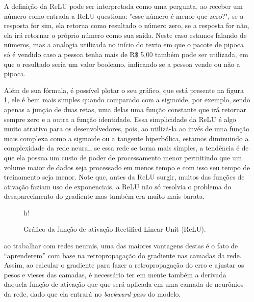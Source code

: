 A definição da ReLU pode ser interpretada como uma pergunta, ao receber um número como entrada a ReLU questiona: "esse número é menor que zero?", se a resposta for sim, ela retorna como resultado o número zero, se a resposta for não, ela irá retornar o próprio número como sua saída. Neste caso estamos falando de números, mas a analogia utilizada no início do texto em que o pacote de pipoca só é vendido caso a pessoa tenha mais de R\$ 5,00 também pode ser utilizada, em que o resultado seria um valor booleano, indicando se a pessoa vende ou não a pipoca.

Além de sua fórmula, é possível plotar o seu gráfico, que está presente na figura \ref{fig:relu}, ele é bem mais simples quando comparado com a sigmoide, por exemplo, sendo apenas a junção de duas retas, uma delas uma função constante que irá retornar sempre zero e a outra a função identidade. Essa simplicidade da ReLU é algo muito atrativo para os desenvolvedores, pois, ao utilizá-la ao invés de uma função mais complexa como a sigmoide ou a tangente hiperbólica, estamos diminuindo a complexidade da rede neural, se essa rede se torna mais simples, a tendência é de que ela possua um custo de poder de processamento menor permitindo que um volume maior de dados seja processado em menos tempo e com isso seu tempo de treinamento seja menor. Note que, antes da ReLU surgir, muitos das funções de ativação faziam uso de exponenciais, a ReLU não só resolvia o problema do desaparecimento do gradiente mas também era muito mais barata.

\begin{figure}{h!}
    \centering
    \caption{Gráfico da função de ativação Rectified Linear Unit (ReLU).}
    \label{fig:relu}
\end{figure}

ao trabalhar com redes neurais, uma das maiores vantagens destas é o fato de “aprenderem” com base na retropropagação do gradiente nas camadas da rede. Assim, ao calcular o gradiente para fazer a retropropagação do erro e ajustar os pesos e vieses das camadas, é necessário ter em mente também a derivada daquela função de ativação que que será aplicada em uma camada de neurônios da rede, dado que ela entrará no \textit{backward pass} do modelo.

